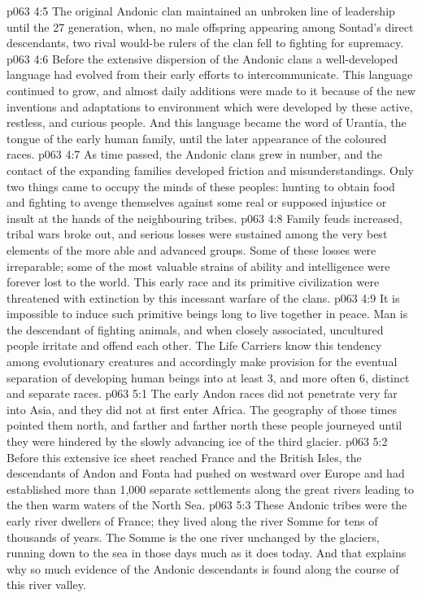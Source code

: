 \vs p063 4:5 \pc The original Andonic clan maintained an unbroken line of leadership until the 27 generation, when, no male offspring appearing among Sontad’s direct descendants, two rival would\hyp{}be rulers of the clan fell to fighting for supremacy.
\vs p063 4:6 Before the extensive dispersion of the Andonic clans a well\hyp{}developed language had evolved from their early efforts to intercommunicate. This language continued to grow, and almost daily additions were made to it because of the new inventions and adaptations to environment which were developed by these active, restless, and curious people. And this language became the word of Urantia, the tongue of the early human family, until the later appearance of the coloured races.
\vs p063 4:7 \pc As time passed, the Andonic clans grew in number, and the contact of the expanding families developed friction and misunderstandings. Only two things came to occupy the minds of these peoples: hunting to obtain food and fighting to avenge themselves against some real or supposed injustice or insult at the hands of the neighbouring tribes.
\vs p063 4:8 Family feuds increased, tribal wars broke out, and serious losses were sustained among the very best elements of the more able and advanced groups. Some of these losses were irreparable; some of the most valuable strains of ability and intelligence were forever lost to the world. This early race and its primitive civilization were threatened with extinction by this incessant warfare of the clans.
\vs p063 4:9 It is impossible to induce such primitive beings long to live together in peace. Man is the descendant of fighting animals, and when closely associated, uncultured people irritate and offend each other. The Life Carriers know this tendency among evolutionary creatures and accordingly make provision for the eventual separation of developing human beings into at least 3, and more often 6, distinct and separate races.
\vs p063 5:1 The early Andon races did not penetrate very far into Asia, and they did not at first enter Africa. The geography of those times pointed them north, and farther and farther north these people journeyed until they were hindered by the slowly advancing ice of the third glacier.
\vs p063 5:2 Before this extensive ice sheet reached France and the British Isles, the descendants of Andon and Fonta had pushed on westward over Europe and had established more than 1,000 separate settlements along the great rivers leading to the then warm waters of the North Sea.
\vs p063 5:3 These Andonic tribes were the early river dwellers of France; they lived along the river Somme for tens of thousands of years. The Somme is the one river unchanged by the glaciers, running down to the sea in those days much as it does today. And that explains why so much evidence of the Andonic descendants is found along the course of this river valley.

